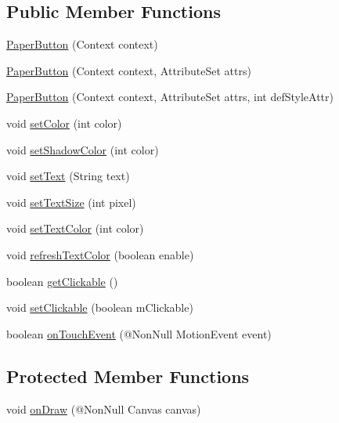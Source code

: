 \subsection*{Public Member Functions}
\begin{DoxyCompactItemize}
\item 
\hyperlink{classcom_1_1material_1_1widget_1_1_paper_button_a0e83131a176236b44a302881412ad641}{Paper\+Button} (Context context)
\item 
\hyperlink{classcom_1_1material_1_1widget_1_1_paper_button_a6031def5ce15bc48ae197f8d81ef6cfd}{Paper\+Button} (Context context, Attribute\+Set attrs)
\item 
\hyperlink{classcom_1_1material_1_1widget_1_1_paper_button_a7ea82d50cba7f1bfc156febfd4982363}{Paper\+Button} (Context context, Attribute\+Set attrs, int def\+Style\+Attr)
\item 
void \hyperlink{classcom_1_1material_1_1widget_1_1_paper_button_a2a591896f213cf7120e95c98411c2efe}{set\+Color} (int color)
\item 
void \hyperlink{classcom_1_1material_1_1widget_1_1_paper_button_a1cdc563636766adcfa94ed86b18a2652}{set\+Shadow\+Color} (int color)
\item 
void \hyperlink{classcom_1_1material_1_1widget_1_1_paper_button_aafc3f5e7acc43a7a322d72336a4c01f6}{set\+Text} (String text)
\item 
void \hyperlink{classcom_1_1material_1_1widget_1_1_paper_button_aeee77e0eff8130125ed69556ccf820ea}{set\+Text\+Size} (int pixel)
\item 
void \hyperlink{classcom_1_1material_1_1widget_1_1_paper_button_a2887ec37726066562a84581a0742cd5c}{set\+Text\+Color} (int color)
\item 
void \hyperlink{classcom_1_1material_1_1widget_1_1_paper_button_ab723582fa4a9686ab25882ea2055a0d5}{refresh\+Text\+Color} (boolean enable)
\item 
boolean \hyperlink{classcom_1_1material_1_1widget_1_1_paper_button_a50c3a7aa2148380e8f93259ae01ef8bc}{get\+Clickable} ()
\item 
void \hyperlink{classcom_1_1material_1_1widget_1_1_paper_button_acdd5dffbebe4dbd791956d84004a2008}{set\+Clickable} (boolean m\+Clickable)
\item 
boolean \hyperlink{classcom_1_1material_1_1widget_1_1_paper_button_a1874d4651d3f45d50933e6710b5cc79c}{on\+Touch\+Event} (@Non\+Null Motion\+Event event)
\end{DoxyCompactItemize}
\subsection*{Protected Member Functions}
\begin{DoxyCompactItemize}
\item 
void \hyperlink{classcom_1_1material_1_1widget_1_1_paper_button_a936dab13a3773f2d870de36fc746f5a1}{on\+Draw} (@Non\+Null Canvas canvas)
\end{DoxyCompactItemize}


